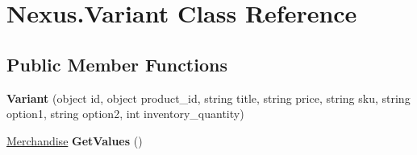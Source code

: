 \hypertarget{class_nexus_1_1_variant}{}\section{Nexus.\+Variant Class Reference}
\label{class_nexus_1_1_variant}
\subsection*{Public Member Functions}
\begin{DoxyCompactItemize}
\item 
\mbox{\label{class_nexus_1_1_variant_a37abf50e7ed36fe89d38ad816d607e74}} 
{\bfseries Variant} (object id, object product\+\_\+id, string title, string price, string sku, string option1, string option2, int inventory\+\_\+quantity)
\item 
\mbox{\label{class_nexus_1_1_variant_abdab435c01f20e66907392f63ba711da}} 
\mbox{\hyperlink{class_nexus_1_1_merchandise}{Merchandise}} {\bfseries Get\+Values} ()
\end{DoxyCompactItemize}
